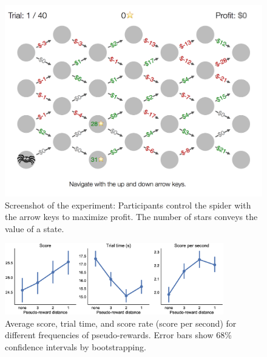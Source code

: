 \documentclass[10pt,letterpaper]{article}
\begin{document}

\begin{figure}
    \centering
    \includegraphics[width=\linewidth]{figs/paradigm.png}
    \caption{Screenshot of the experiment: Participants control the spider with the arrow keys to maximize profit. The number of stars conveys the value of a state.}
    \label{fig:paradigm}
\end{figure}


\begin{figure}[t!]
    \centering
    \includegraphics[width=0.85\textwidth]{figs/basic.eps}
    \caption{Average score, trial time, and score rate (score per second) for different frequencies of pseudo-rewards. Error bars show 68\% confidence intervals by bootstrapping.}
    \label{fig:basic}
\end{figure}
\end{document}
